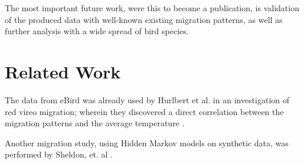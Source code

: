 \documentclass{article} %
\begin{document}
The most important future work, were this to become a publication, is validation of the produced data with well-known existing migration patterns, as well as further analysis with a wide spread of bird species.

\section{Related Work}
The data from eBird was already used by Hurlbert et al. in an investigation of red vireo migration; wherein they discovered a direct correlation between the migration patterns and the average temperature \cite{hurlbert}. 

Another migration study, using Hidden Markov models on synthetic data, was performed by Sheldon, et. al \cite{conf/nips/SheldonEK07}. 



\end{document}
